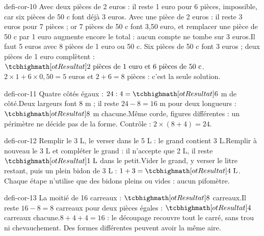 \begin{blocEdition}{defi-cor-10}
Avec deux pièces de 2 euros : il reste 1 euro pour 6 pièces, impossible, car six pièces de 50 c font déjà 3 euros. Avec une pièce de 2 euros : il reste 3 euros pour 7 pièces ; or 7 pièces de 50 c font 3,50 euro, et remplacer une pièce de 50 c par 1 euro augmente encore le total : aucun compte ne tombe sur 3 euros.Il faut 5 euros avec 8 pièces de 1 euro ou 50 c. Six pièces de 50 c font 3 euros ; deux pièces de 1 euro complètent : $\res{2\ \text{pièces de 1 euro et 6 pièces de 50 c}}$.$2\times1+6\times0{,}50=5$ euros et $2+6=8$ pièces : c’est la seule solution.
\end{blocEdition}
\begin{blocEdition}{defi-cor-11}
Quatre côtés égaux : $24:4=\res6$ m de côté.Deux largeurs font 8 m ; il reste $24-8=16$ m pour deux longueurs : $\res8$ m chacune.Même corde, figures différentes : un périmètre ne décide pas de la forme. Contrôle : $2\times(8+4)=24$.
\end{blocEdition}
\begin{blocEdition}{defi-cor-12}
Remplir le 3 L, le verser dans le 5 L : le grand contient 3 L.Remplir à nouveau le 3 L et compléter le grand : il n’accepte que 2 L, il reste $\res{1\ \mathrm L}$ dans le petit.Vider le grand, y verser le litre restant, puis un plein bidon de 3 L : $1+3=\res{4\ \mathrm L}$. Chaque étape n’utilise que des bidons pleins ou vides : aucun pifomètre.
\end{blocEdition}
\begin{blocEdition}{defi-cor-13}
La moitié de 16 carreaux : $\res8$ carreaux.Il reste $16-8=8$ carreaux pour deux pièces égales : $\res4$ carreaux chacune.$8+4+4=16$ : le découpage recouvre tout le carré, sans trou ni chevauchement. Des formes différentes peuvent avoir la même aire.
\end{blocEdition}
